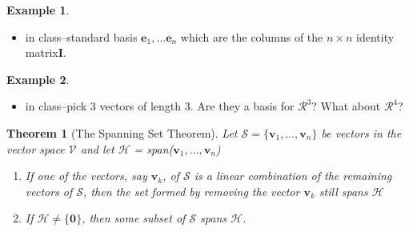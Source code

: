 \documentclass[
]{book}
\providecommand{\tightlist}{%
  \setlength{\itemsep}{0pt}\setlength{\parskip}{0pt}}
\newtheorem{theorem}{Theorem}[chapter]
\theoremstyle{definition}
\theoremstyle{definition}
\newtheorem{example}{Example}[chapter]
\theoremstyle{definition}
\theoremstyle{definition}
\theoremstyle{remark}
\begin{document}
\begin{example}

\begin{itemize}
\tightlist
\item
  in class--standard basis \(\mathbf{e}_1, \ldots \mathbf{e}_n\) which are the columns of the \(n \times n\) identity matrix\(\mathbf{I}\).
\end{itemize}

\end{example}

\begin{example}

\begin{itemize}
\tightlist
\item
  in class--pick 3 vectors of length 3. Are they a basis for \(\mathcal{R}^3\)? What about \(\mathcal{R}^4\)?
\end{itemize}

\end{example}

\begin{theorem}[The Spanning Set Theorem]

Let \(\mathcal{S} = \{\mathbf{v}_1, \ldots, \mathbf{v}_n\}\) be vectors in the vector space \(\mathcal{V}\) and let \(\mathcal{H}\) = span(\(\mathbf{v}_1, \ldots, \mathbf{v}_n\))

\begin{enumerate}
\def\labelenumi{\alph{enumi})}
\item
  If one of the vectors, say \(\mathbf{v}_k\), of \(\mathcal{S}\) is a linear combination of the remaining vectors of \(\mathcal{S}\), then the set formed by removing the vector \(\mathbf{v}_k\) still spans \(\mathcal{H}\)
\item
  If \(\mathcal{H} \neq \{\mathbf{0}\}\), then some subset of \(\mathcal{S}\) spans \(\mathcal{H}\).
\end{enumerate}

\end{theorem}
\end{document}
